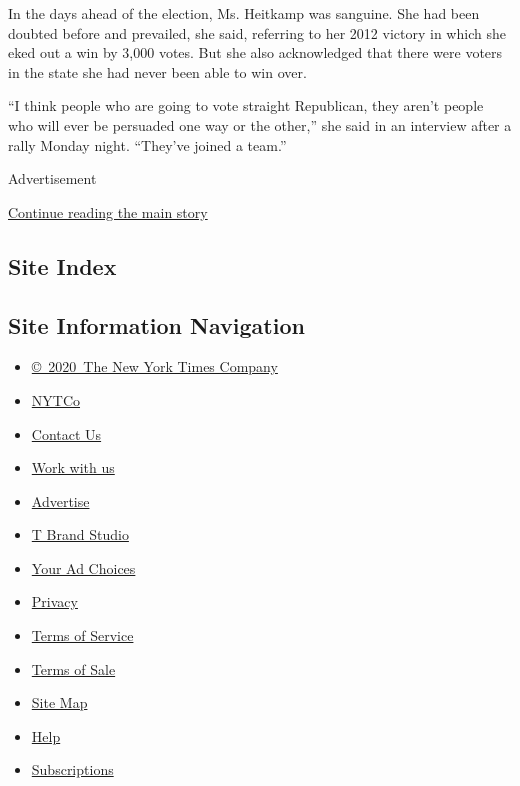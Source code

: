 In the days ahead of the election, Ms. Heitkamp was sanguine. She had
been doubted before and prevailed, she said, referring to her 2012
victory in which she eked out a win by 3,000 votes. But she also
acknowledged that there were voters in the state she had never been able
to win over.

``I think people who are going to vote straight Republican, they aren't
people who will ever be persuaded one way or the other,'' she said in an
interview after a rally Monday night. ``They've joined a team.''

Advertisement

\protect\hyperlink{after-bottom}{Continue reading the main story}

\hypertarget{site-index}{%
\subsection{Site Index}\label{site-index}}

\hypertarget{site-information-navigation}{%
\subsection{Site Information
Navigation}\label{site-information-navigation}}

\begin{itemize}
\tightlist
\item
  \href{https://help.nytimes.com/hc/en-us/articles/115014792127-Copyright-notice}{©~2020~The
  New York Times Company}
\end{itemize}

\begin{itemize}
\tightlist
\item
  \href{https://www.nytco.com/}{NYTCo}
\item
  \href{https://help.nytimes.com/hc/en-us/articles/115015385887-Contact-Us}{Contact
  Us}
\item
  \href{https://www.nytco.com/careers/}{Work with us}
\item
  \href{https://nytmediakit.com/}{Advertise}
\item
  \href{http://www.tbrandstudio.com/}{T Brand Studio}
\item
  \href{https://www.nytimes.com/privacy/cookie-policy\#how-do-i-manage-trackers}{Your
  Ad Choices}
\item
  \href{https://www.nytimes.com/privacy}{Privacy}
\item
  \href{https://help.nytimes.com/hc/en-us/articles/115014893428-Terms-of-service}{Terms
  of Service}
\item
  \href{https://help.nytimes.com/hc/en-us/articles/115014893968-Terms-of-sale}{Terms
  of Sale}
\item
  \href{https://spiderbites.nytimes.com}{Site Map}
\item
  \href{https://help.nytimes.com/hc/en-us}{Help}
\item
  \href{https://www.nytimes.com/subscription?campaignId=37WXW}{Subscriptions}
\end{itemize}
